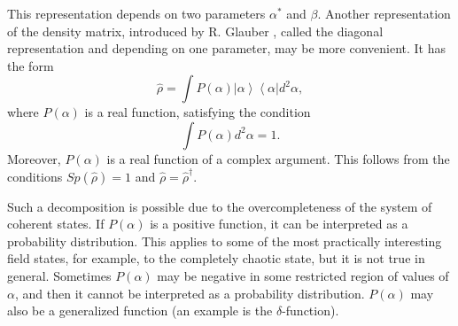 This representation depends on two parameters $\alpha^{*}$ and $\beta$.
Another representation of the density matrix, introduced by R. Glauber \cite{bQuantumOpticsAndRadioPhisicsLecture1966}, called the 
diagonal representation and depending on one parameter, may be more convenient. It has the form  
\begin{equation}
\hat{\rho} = \int
P\left(\alpha\right)\left|\alpha\right>\left<\alpha\right| d^2 \alpha,
\label{eqCh1_rhorepresent}
\end{equation}
where  $P\left(\alpha\right)$ is a real function,
satisfying the condition 
\[
\int
P\left(\alpha\right) d^2 \alpha = 1.
\]
Moreover, $P\left(\alpha\right)$ is a real function of a complex
argument. This follows from the conditions  $Sp\left(\hat{\rho}\right) = 1$
and  $\hat{\rho} = \hat{\rho}^{\dag}$.
  
Such a decomposition is possible due to the overcompleteness of the system of coherent
states. If   $P\left(\alpha\right)$  is a positive function, it
can be interpreted 
as a probability distribution. This applies to some of the most
practically interesting field states, for example, to the completely chaotic state, but it is not true in general.
Sometimes   $P\left(\alpha\right)$  may be negative in
some restricted region of values of $\alpha$,  and then it cannot be interpreted as
a probability distribution.   $P\left(\alpha\right)$ may also be a generalized function
(an example is the $\delta$-function). 


